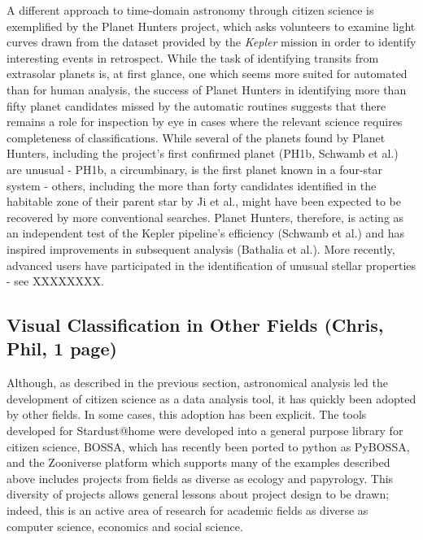 \documentclass{ar2e}
\begin{document}
A different approach to time-domain astronomy through citizen science is
exemplified by the Planet Hunters project, which asks volunteers to examine
light curves drawn from the dataset provided by the \emph{Kepler} mission in
order to identify interesting events in retrospect. While the task of
identifying transits from extrasolar planets is, at first glance, one which
seems more suited for automated than for human analysis, the success of Planet
Hunters in identifying more than fifty planet candidates missed by the
automatic routines suggests that there remains a role for inspection by eye in
cases where the relevant science requires completeness of classifications.
While several of the planets found by Planet Hunters, including the project's
first confirmed planet (PH1b, Schwamb et al.) are unusual - PH1b, a
circumbinary, is the first planet known in a four-star system - others,
including the more than forty candidates identified in the habitable zone of
their parent star by Ji et al., might have been expected to be recovered by
more conventional searches. Planet Hunters, therefore, is acting as an
independent test of the Kepler pipeline's efficiency (Schwamb et al.) and has
inspired improvements in subsequent analysis (Bathalia et al.). More recently,
advanced users have participated in the identification of unusual stellar
properties - see XXXXXXXX. 




\subsection{Visual Classification in Other Fields (\textbf{Chris}, Phil, 1 page)}
\label{sec:class:non-astro}

Although, as described in the previous section, astronomical analysis led the
development of citizen science as a data analysis tool, it has quickly been
adopted by other fields. In some cases, this adoption has been explicit. The
tools developed for Stardust@home were developed into a general purpose
library for citizen science, BOSSA, which has recently been ported to python
as PyBOSSA, and the Zooniverse platform which supports many of the examples
described above includes projects from fields as diverse as ecology and
papyrology. This diversity of projects allows general lessons about project
design to be drawn; indeed, this is an active area of research for academic
fields as diverse as computer science, economics and social science. 
\end{document}
